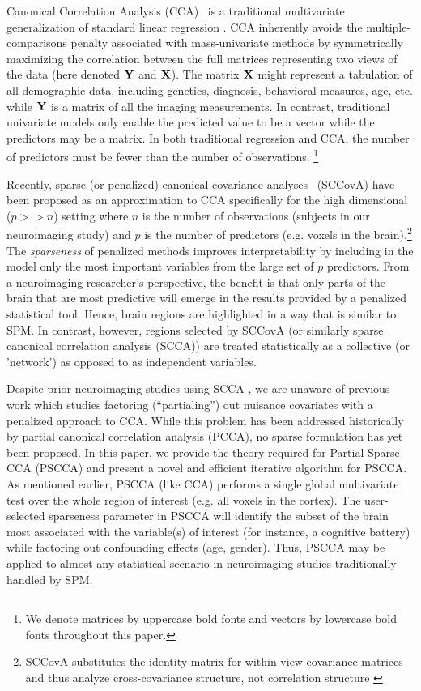 \documentclass{llncs}
\newcommand{\X}{{\bf X}}
\newcommand{\Y}{{\bf Y}}
\begin{document}
Canonical Correlation Analysis (CCA)~\cite{hotellingcca} is a
traditional multivariate generalization of standard linear regression
\cite{kshirsagar}.  CCA inherently avoids the multiple-comparisons
penalty associated with mass-univariate methods by symmetrically
maximizing the correlation between the full matrices representing two
views of the data (here denoted $\Y$ and $\X$).  The matrix {$\X$}
might represent a tabulation of all demographic data, including
genetics, diagnosis, behavioral measures, age, etc. while $\Y$ is a
matrix of all the imaging measurements.  In contrast, traditional
univariate models only enable the predicted value to be a vector while
the predictors may be a matrix.  In both traditional regression and CCA, the
number of predictors must be fewer than the number of observations. 
\footnote{We denote matrices by
uppercase bold fonts and vectors by lowercase bold fonts throughout
this paper.} 

Recently, sparse (or penalized) canonical covariance
analyses~\cite{parkhomenko,witten,lykou} (SCCovA) have been proposed
as an approximation to CCA specifically for the high dimensional ($p
>>n$) setting where $n$ is the number of observations (subjects in our
neuroimaging study) and $p$ is the number of predictors (e.g. voxels
in the brain).\footnote{SCCovA substitutes the identity matrix for
within-view covariance matrices and thus analyze cross-covariance
structure, not correlation structure \cite{cherry}}  The {\em
sparseness} of penalized methods improves interpretability by including in the model
only the most important variables from the large set of $p$
predictors.  From a neuroimaging researcher's perspective, the
benefit is that only parts of the brain that are most predictive will
emerge in the results provided by a penalized statistical tool.
Hence, brain regions are highlighted in a way that is similar to
SPM.  In contrast, however, regions selected by SCCovA (or similarly
sparse canonical correlation analysis (SCCA)) are treated
statistically as a collective (or 'network') as opposed to as
independent variables.

Despite prior neuroimaging studies using SCCA \cite{Avants2010b}, we
are unaware of previous work which studies factoring (``partialing'')
out nuisance covariates with a penalized approach to CCA.  While this
problem has been addressed historically by partial canonical
correlation analysis (PCCA)\cite{timm}, no sparse formulation has yet been
proposed.  In this paper, we provide the theory required for Partial Sparse CCA
(PSCCA) and present a novel and efficient iterative algorithm for
PSCCA. As mentioned earlier, PSCCA (like CCA) performs a single global
multivariate test over the whole region of interest (e.g. all
voxels in the cortex). The user-selected sparseness parameter in PSCCA will identify
the subset of the brain most associated with the variable(s) of interest
(for instance, a cognitive battery) while factoring out confounding
effects (age, gender).  Thus, PSCCA may be applied to almost any statistical
scenario in neuroimaging studies traditionally handled by SPM.  
\end{document}
